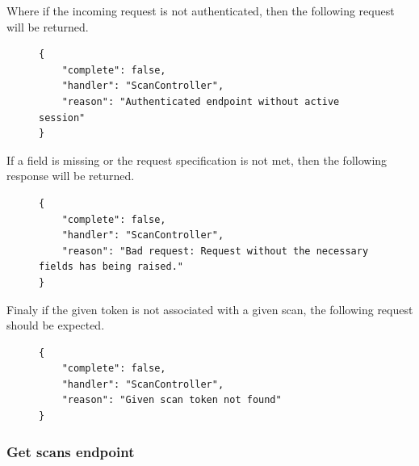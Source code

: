 					Where if the incoming request is not authenticated, then the following request will be returned.
					\begin{figure}[H]
						\iftrue
						\begin{lstlisting}[]
{
	"complete": false,
	"handler": "ScanController",
	"reason": "Authenticated endpoint without active session"
}
						\end{lstlisting}
					\end{figure}
					If a field is missing or the request specification is not met, then the following response will be returned.
					\begin{figure}[H]
						\iftrue
						\begin{lstlisting}[]
{
	"complete": false,
	"handler": "ScanController",
	"reason": "Bad request: Request without the necessary fields has being raised."
}					
						\end{lstlisting}
					\end{figure}
					Finaly if the given token is not associated with a given scan, the following request should be expected.
					\begin{figure}[H]
						\iftrue
						\begin{lstlisting}[]
{
	"complete": false,
	"handler": "ScanController",
	"reason": "Given scan token not found"
}		
						\end{lstlisting}
					\end{figure}
					
				\subsubsection{Get scans endpoint}
				
